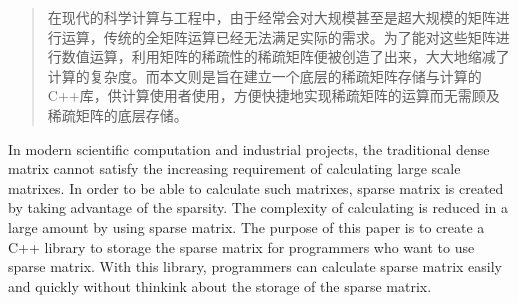\begin{abstract}
在现代的科学计算与工程中，由于经常会对大规模甚至是超大规模的矩阵进行运算，传统的全矩阵运算已经无法满足实际的需求。为了能对这些矩阵进行数值运算，利用矩阵的稀疏性的稀疏矩阵便被创造了出来，大大地缩减了计算的复杂度。而本文则是旨在建立一个底层的稀疏矩阵存储与计算的C++库，供计算使用者使用，方便快捷地实现稀疏矩阵的运算而无需顾及稀疏矩阵的底层存储。

\end{abstract}


\begin{englishabstract}
In modern scientific computation and industrial projects, the traditional dense matrix cannot satisfy the increasing requirement of calculating large scale matrixes. In order to be able to calculate such matrixes, sparse matrix is created by taking advantage of the sparsity. The complexity of calculating is reduced in a large amount by using sparse matrix. The purpose of this paper is to create a C++ library to storage the sparse matrix for programmers who want to use sparse matrix. With this library, programmers can calculate sparse matrix easily and quickly without thinkink about the storage of the sparse matrix.

\end{englishabstract}